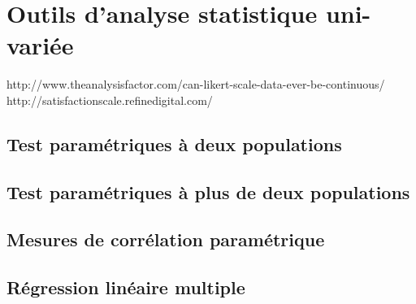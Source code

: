 \chapter{Outils d'analyse statistique uni-variée}
\label{app:statuni}

http://www.theanalysisfactor.com/can-likert-scale-data-ever-be-continuous/ \\
http://satisfactionscale.refinedigital.com/
\section{Test paramétriques à deux populations}
\label{app:student}

\section{Test paramétriques à plus de deux populations}
\label{app:anova}

\section{Mesures de corrélation paramétrique}
\label{app:corr}

\section{Régression linéaire multiple}
\label{app:regressionMultiple}

